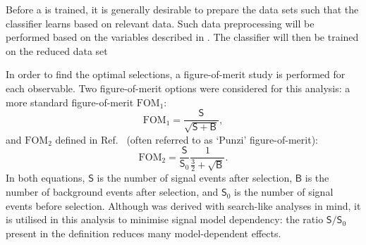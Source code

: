 Before a \BDT is trained, it is generally desirable to prepare the data sets such that the classifier 
learns based on relevant data.
Such data preprocessing will be performed based on the variables described in .
The classifier will then be trained on the reduced data set

In order to find the optimal selections, a figure-of-merit study is performed for each observable.
Two figure-of-merit options were considered for this analysis: a more standard figure-of-merit $\mathrm{FOM}_1$:
\begin{equation}\label{eq:soversqrtsplusb}
    \mathrm{FOM}_1 = \frac{\mathsf{S}}{\sqrt{\mathsf{S}+\mathsf{B}}},
\end{equation}
and $\mathrm{FOM}_2$ defined in Ref.~\cite{Punzi:2003bu} (often referred to as `Punzi' figure-of-merit):
\begin{equation}\label{eq:punzi_fom}
    \mathrm{FOM}_2 = \frac{\mathsf{S}}{\mathsf{S}_0} \frac{1}{\frac{3}{2}+\sqrt{\mathsf{B}}}.
\end{equation}
In both equations, $\mathsf{S}$ is the number of signal events after selection, 
$\mathsf{B}$ is the number of background events after selection, 
and $\mathsf{S}_0$ is the number of signal events before selection.
Although  was derived with search-like analyses in mind, 
it is utilised in this analysis to minimise signal model dependency: the ratio $\mathsf{S}/\mathsf{S}_0$ present in the definition reduces many model-dependent effects.

